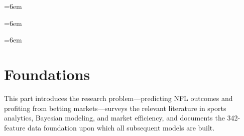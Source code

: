 \documentclass[12pt]{report}  %
\numberwithin{equation}{section}
\theoremstyle{plain}
\theoremstyle{definition}
\theoremstyle{remark}
\providecommand{\mainmatter}{\cleardoublepage\pagenumbering{arabic}}
\begin{document}
\cleardoublepage
{}
\begingroup\sloppy\RaggedRight\emergencystretch=6em
\tableofcontents
\endgroup

\cleardoublepage
{}
{}
\begingroup\sloppy\RaggedRight\emergencystretch=6em
\listoffigures
\endgroup

\cleardoublepage
{}
{}
\begingroup\sloppy\RaggedRight\emergencystretch=6em
\listoftables
\endgroup

\cleardoublepage
{}
{}


\hypersetup{pageanchor=true}
\mainmatter


\part{Foundations}
\noindent This part introduces the research problem—predicting NFL outcomes
and profiting from betting markets—surveys the relevant literature in sports
analytics, Bayesian modeling, and market efficiency, and documents the 342-feature
data foundation upon which all subsequent models are built.




\end{document}
